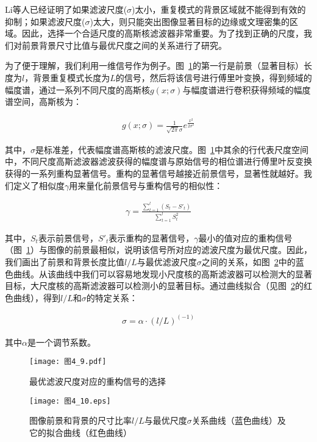 Li等人\cite{LiJianTPAMI2013Scale}已经证明了如果滤波尺度($\sigma$)太小，重复模式的背景区域就不能得到有效的抑制；如果滤波尺度($\sigma$)太大，则只能突出图像显著目标的边缘或文理密集的区域。因此，选择一个合适尺度的高斯核滤波器非常重要。为了找到正确的尺度，我们对前景背景尺寸比值与最优尺度之间的关系进行了研究。

为了便于理解，我们利用一维信号作为例子。图~\ref{图4_9}的第一行是前景（显著目标）长度为$l$，背景重复模式长度为$L$的信号，然后将该信号进行傅里叶变换，得到频域的幅度谱，通过一系列不同尺度的高斯核$g(x;\sigma)$与幅度谱进行卷积获得频域的幅度谱空间，高斯核为：
\begin{linenomath}
\begin{align}
g(x;\sigma)=\frac{1}{\sqrt{2\pi}\sigma}e^{\frac{x^{2}}{2\sigma^{2}}}
\label{式4_5}
\end{align}
\end{linenomath}
其中，$\sigma$是标准差，代表幅度谱高斯核的滤波尺度。图~\ref{图4_9}中其余的行代表尺度空间中，不同尺度高斯滤波器滤波获得的幅度谱与原始信号的相位谱进行傅里叶反变换获得的一系列重构显著信号。重构的显著信号越接近前景信号，显著性就越好。我们定义了相似度$\gamma$用来量化前景信号与重构信号的相似性：
\begin{linenomath}
\begin{align}
\gamma=\frac{\sum_{t=1}^{l}(S_{t}-S'_{t})}{\sum_{t=1}^{l}S_{t}^{2}}
\label{式4_6}
\end{align}
\end{linenomath}
其中，$S_{t}$表示前景信号，$S'_{t}$表示重构的显著信号，$\gamma$最小的值对应的重构信号（图~\ref{图4_9}）与图像的前景最相似，说明该信号所对应的滤波尺度为最优尺度。因此，我们画出了前景和背景长度比值$l/L$与最优滤波尺度$\sigma$之间的关系，如图~\ref{图4_10}中的蓝色曲线。从该曲线中我们可以容易地发现小尺度核的高斯滤波器可以检测大的显著目标，大尺度核的高斯滤波器可以检测小的显著目标。通过曲线拟合（见图~\ref{图4_10}的红色曲线），得到$l/L$和$\sigma$的特定关系：
\begin{linenomath}
\begin{align}
\sigma=\alpha\cdot(l/L)^{(-1)}
\label{式4_7}
\end{align}
\end{linenomath}
其中$\alpha$是一个调节系数。
\begin{figure}[h]
  \centering
  \texttt{[image: 图4\_9.pdf]}
  \caption{最优滤波尺度对应的重构信号的选择}   
  \label{图4_9} 
\end{figure}
\begin{figure}[h]
  \centering
  \texttt{[image: 图4\_10.eps]}
  \caption{图像前景和背景的尺寸比率$l/L$与最优尺度$\sigma$关系曲线（蓝色曲线）及它的拟合曲线（红色曲线）}   
  \label{图4_10} 
\end{figure}

